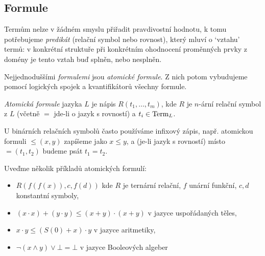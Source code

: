\subsection{Formule}

Termům nelze v žádném smyslu přiřadit pravdivostní hodnotu, k tomu potřebujeme \emph{predikát} (relační symbol nebo rovnost), který mluví o `vztahu' termů: v konkrétní struktuře při konkrétním ohodnocení proměnných prvky z domény je tento vztah buď splněn, nebo nesplněn. 

Nejjednoduššími \emph{formulemi} jsou \emph{atomické formule}. Z nich potom vybudujeme pomocí logických spojek a kvantifikátorů všechny formule.


\begin{definition}
    \emph{Atomická formule} jazyka $L$ je nápis $R(t_1,\dots,t_m)$, kde $R$ je $n$-ární relační symbol z $L$ (včetně $=$ jde-li o jazyk s rovností) a $t_i\in\operatorname{Term}_L$. %
\end{definition}

U binárních relačních symbolů často používáme infixový zápis, např. atomickou formuli $\leq(x,y)$ zapíšeme jako $x\leq y$, a (je-li jazyk s rovností) místo $=(t_1,t_2)$ budeme psát $t_1=t_2$.

\begin{example}
    Uveďme několik příkladů atomických formulí:
    \begin{itemize}
        \item $R(f(f(x)),c, f(d))$ kde $R$ je ternární relační, $f$ unární funkční, $c,d$ konstantní symboly,
        \item $(x\cdot x)+(y\cdot y)\leq (x+y)\cdot(x+y)$ v jazyce uspořádaných těles,
        \item $x\cdot y\leq (S(0)+x)\cdot y$ v jazyce aritmetiky,
        \item $\neg(x\land y)\lor\bot=\bot$ v jazyce Booleových algeber        
    \end{itemize}
\end{example}


